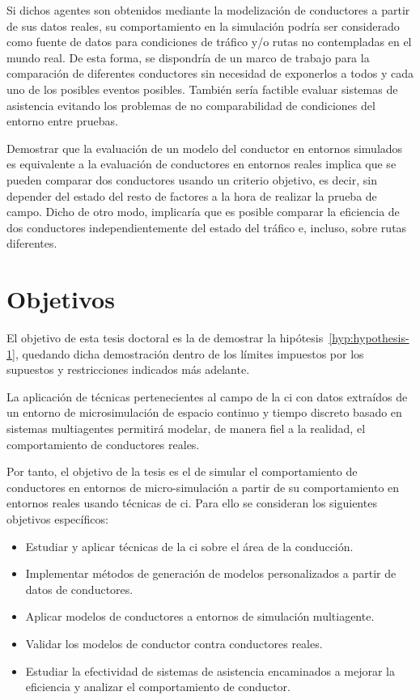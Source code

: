 Si dichos agentes son obtenidos mediante la modelización de conductores a partir de sus datos reales, su comportamiento en la simulación podría ser considerado como fuente de datos para condiciones de tráfico y/o rutas no contempladas en el mundo real. De esta forma, se dispondría de un marco de trabajo para la comparación de diferentes conductores sin necesidad de exponerlos a todos y cada uno de los posibles eventos posibles. También sería factible evaluar sistemas de asistencia evitando los problemas de no comparabilidad de condiciones del entorno entre pruebas.

Demostrar que la evaluación de un modelo del conductor en entornos simulados es equivalente a la evaluación de conductores en entornos reales implica que se pueden comparar dos conductores usando un criterio objetivo, es decir, sin depender del estado del resto de factores a la hora de realizar la prueba de campo. Dicho de otro modo, implicaría que es posible comparar la eficiencia de dos conductores independientemente del estado del tráfico e, incluso, sobre rutas diferentes.

\section{Objetivos}
\label{ch:intro:objectives}

El objetivo de esta tesis doctoral es la de demostrar la hipótesis~\ref{hyp:hypothesis-1}, quedando dicha demostración dentro de los límites impuestos por los supuestos y restricciones indicados más adelante.

\begin{hyp} \label{hyp:hypothesis-1}
	La aplicación de técnicas pertenecientes al campo de la \ac{ci} con datos extraídos de un entorno de microsimulación de espacio continuo y tiempo discreto basado en sistemas multiagentes permitirá modelar, de manera fiel a la realidad, el comportamiento de conductores reales.
\end{hyp}

Por tanto, el objetivo de la tesis es el de simular el comportamiento de conductores en entornos de micro-simulación a partir de su comportamiento en entornos reales usando técnicas de \ac{ci}. Para ello se consideran los siguientes objetivos específicos:

\begin{itemize}
	\item Estudiar y aplicar técnicas de la \ac{ci} sobre el área de la conducción.
	\item Implementar métodos de generación de modelos personalizados a partir de datos de conductores.
	\item Aplicar modelos de conductores a entornos de simulación multiagente.
	\item Validar los modelos de conductor contra conductores reales.
	\item Estudiar la efectividad de sistemas de asistencia encaminados a mejorar la eficiencia y analizar el comportamiento de conductor.
\end{itemize}

